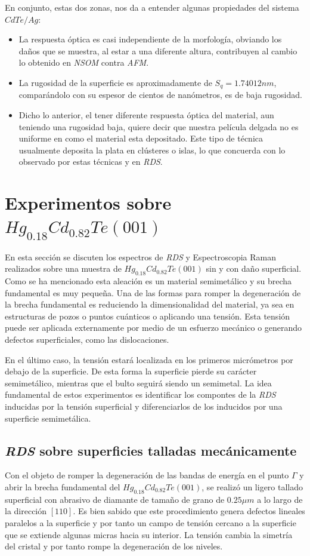 En conjunto, estas dos zonas, nos da a entender algunas propiedades del sistema $ CdTe/Ag $:
\begin{itemize}
    \item La respuesta óptica es casi independiente de la morfología, obviando los daños que se muestra, al estar a una diferente altura, contribuyen al cambio lo obtenido en \textit{NSOM} contra \textit{AFM}.
    \item La rugosidad de la superficie es aproximadamente de $S_{q} = 1.74012 nm$, comparándolo con su espesor de cientos de nanómetros, es de baja rugosidad.
    \item Dicho lo anterior, el tener diferente respuesta óptica del material, aun teniendo una rugosidad baja, quiere decir que nuestra película delgada no es uniforme en como el material esta depositado. Este tipo de técnica usualmente deposita la plata en clústeres o islas, lo que concuerda con lo observado por estas técnicas y en \textit{RDS}. 
 \end{itemize}

\newpage

\section{Experimentos sobre $ Hg_{0.18}Cd_{0.82}Te (001)$}
\label{sec:chap4-hgcdte}
En esta sección se discuten los espectros de \textit{RDS} y Espectroscopia Raman realizados sobre una muestra de $ Hg_{0.18}Cd_{0.82}Te (001) $ sin y con daño superficial. Como se ha mencionado esta aleación es un material semimetálico y su brecha fundamental es muy pequeña. Una de las formas para romper la degeneración de la brecha fundamental es reduciendo la dimensionalidad del material, ya sea en estructuras de pozos o puntos cuánticos o aplicando una tensión. Esta tensión puede ser aplicada externamente por medio de un esfuerzo mecánico o generando defectos superficiales, como las dislocaciones.

En el último caso, la tensión estará localizada en los primeros micrómetros por debajo de la superficie. De esta forma la superficie pierde su carácter semimetálico, mientras que el bulto seguirá siendo un semimetal. La idea fundamental de estos experimentos es identificar los compontes de la \textit{RDS} inducidas por la tensión superficial y diferenciarlos de los inducidos por una superficie semimetálica.

\subsection{\textit{RDS} sobre superficies talladas mecánicamente}
\label{sec:chap4-hgcdte-rds}
Con el objeto de romper la degeneración de las bandas de energía en el punto $\Gamma$ y abrir la brecha fundamental del $ Hg_{0.18}Cd_{0.82}Te (001) $, se realizó un ligero tallado superficial con abrasivo de diamante de tamaño de grano de $ 0.25 \mu m $ a lo largo de la dirección $ [110] $. Es bien sabido que este procedimiento genera defectos lineales paralelos a la superficie y por tanto un campo de tensión cercano a la superficie que se extiende algunas micras hacia su interior\cite{LastrasMartnez1996}. La tensión cambia la simetría del cristal y por tanto rompe la degeneración de los niveles. 

